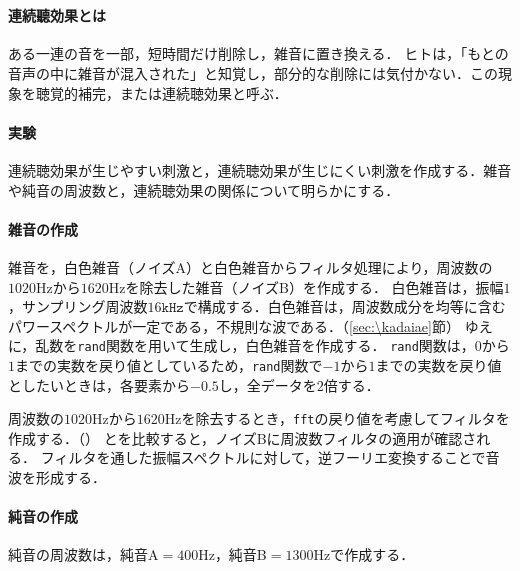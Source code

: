 \section{\kadaidb}\label{sec:\kadaidb}
\purpose
\paragraph{連続聽効果とは}
ある一連の音を一部，短時間だけ削除し，雑音に置き換える．
ヒトは，「もとの音声の中に雑音が混入された」と知覚し，部分的な削除には気付かない．この現象を聴覚的補完，または連続聴効果と呼ぶ．\cite[p.182\ -\ p.183]{感覚知覚心理学}
\paragraph{実験}
連続聴効果が生じやすい刺激と，連続聴効果が生じにくい刺激を作成する．雑音や純音の周波数と，連続聴効果の関係について明らかにする．
\method
\paragraph{雑音の作成}
雑音を，白色雑音（ノイズA）と白色雑音からフィルタ処理により，周波数の\(1020\textrm{Hz}\)から\(1620\textrm{Hz}\)を除去した雑音（ノイズB）を作成する．
白色雑音は，振幅\(1\)，サンプリング周波数\(16\texttt{kHz}\)で構成する．白色雑音は，周波数成分を均等に含むパワースペクトルが一定である，不規則な波である．（\ref{sec:\kadaiae}節）
ゆえに，乱数を\texttt{rand}関数を用いて生成し，白色雑音を作成する．
\texttt{rand}関数は，\(0\)から\(1\)までの実数を戻り値としているため，\texttt{rand}関数で\(-1\)から\(1\)までの実数を戻り値としたいときは，各要素から\(-0.5\)し，全データを\(2\)倍する．\par
周波数の\(1020\textrm{Hz}\)から\(1620\textrm{Hz}\)を除去するとき，\texttt{fft}の戻り値を考慮してフィルタを作成する．（）
とを比較すると，ノイズBに周波数フィルタの適用が確認される．
フィルタを通した振幅スペクトルに対して，逆フーリエ変換することで音波を形成する．\par
\paragraph{純音の作成}純音の周波数は，純音A\(=400\textrm{Hz}\)，純音B\(=1300\textrm{Hz}\)で作成する．
